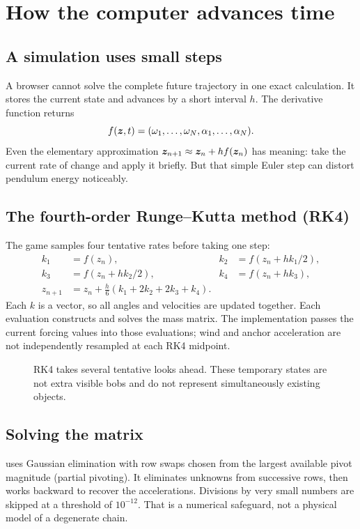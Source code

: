 \documentclass[11pt,a4paper]{article}
\newcommand{\code}[1]{\texttt{\detokenize{#1}}}
\begin{document}
\section{How the computer advances time}
\subsection{A simulation uses small steps}
A browser cannot solve the complete future trajectory in one exact calculation. It stores the current state and advances by a short interval \(h\). The derivative function returns
\[
 f(\boldsymbol{z},t)=(\omega_1,\ldots,\omega_N,\alpha_1,\ldots,\alpha_N).
\]
Even the elementary approximation \(\boldsymbol{z}_{n+1}\approx\boldsymbol{z}_n+h f(\boldsymbol{z}_n)\) has meaning: take the current rate of change and apply it briefly. But that simple Euler step can distort pendulum energy noticeably.
\subsection{The fourth-order Runge--Kutta method (RK4)}
The game samples four tentative rates before taking one step:
\begin{align*}
 k_1&=f(z_n),& k_2&=f(z_n+hk_1/2),\\
 k_3&=f(z_n+hk_2/2),&k_4&=f(z_n+hk_3),\\
 z_{n+1}&=z_n+\frac h6(k_1+2k_2+2k_3+k_4).
\end{align*}
Each \(k\) is a vector, so all angles and velocities are updated together. Each evaluation constructs and solves the mass matrix. The implementation passes the current forcing values into those evaluations; wind and anchor acceleration are not independently resampled at each RK4 midpoint.
\begin{figure}[H]\centering
{}\caption{RK4 takes several tentative looks ahead. These temporary states are not extra visible bobs and do not represent simultaneously existing objects.}
\end{figure}
\subsection{Solving the matrix}
\code{solveMatrix} uses Gaussian elimination with row swaps chosen from the largest available pivot magnitude (partial pivoting). It eliminates unknowns from successive rows, then works backward to recover the accelerations. Divisions by very small numbers are skipped at a threshold of \(10^{-12}\). That is a numerical safeguard, not a physical model of a degenerate chain.
\end{document}
